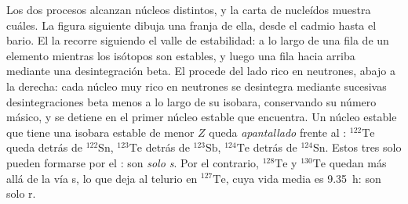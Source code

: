 Los dos procesos alcanzan núcleos distintos, y la carta de nucleídos
muestra cuáles. La figura siguiente dibuja una franja de ella, desde el cadmio hasta el
bario. El  la recorre siguiendo el valle de estabilidad: a lo largo de una
fila de un elemento mientras los isótopos son estables, y luego una fila hacia arriba mediante una
desintegración beta. El  procede del lado rico en neutrones, abajo
a la derecha: cada núcleo muy rico en neutrones se desintegra mediante sucesivas desintegraciones beta menos
a lo largo de su isobara, conservando su número másico, y se detiene en el primer
núcleo estable que encuentra. Un núcleo estable que tiene una isobara estable de
menor $Z$ queda \emph{apantallado} frente al : $^{122}\mathrm{Te}$
queda detrás de $^{122}\mathrm{Sn}$, $^{123}\mathrm{Te}$ detrás de
$^{123}\mathrm{Sb}$, $^{124}\mathrm{Te}$ detrás de $^{124}\mathrm{Sn}$.
Estos tres solo pueden formarse por el : son
\emph{solo s}. Por el contrario, $^{128}\mathrm{Te}$ y $^{130}\mathrm{Te}$
quedan más allá de la vía s, lo que deja al telurio en $^{127}\mathrm{Te}$,
cuya vida media es \qty{9.35}{h}: son solo r.

